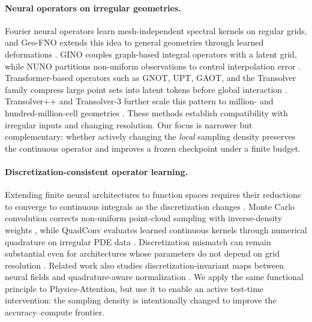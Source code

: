 \documentclass{article}
\begin{document}
\paragraph{Neural operators on irregular geometries.}
Fourier neural operators learn mesh-independent spectral kernels on regular
grids, and Geo-FNO extends this idea to general geometries through learned
deformations \citep{li2021fno,li2023geofno}. GINO couples graph-based integral
operators with a latent grid, while NUNO partitions non-uniform observations to
control interpolation error \citep{li2023gino,liu2023nuno}. Transformer-based
operators such as GNOT, UPT, GAOT, and the Transolver family compress large point
sets into latent tokens before global interaction
\citep{hao2023gnot,alkin2024upt,wen2025gaot,wu2024transolver}. Transolver++ and
Transolver-3 further scale this pattern to million- and hundred-million-cell
geometries \citep{luo2025transolverpp,zhou2026transolver3}. These methods
establish compatibility with irregular inputs and changing resolution. Our
focus is narrower but complementary: whether actively changing the \emph{local}
sampling density preserves the continuous operator and improves a frozen
checkpoint under a finite budget.

\paragraph{Discretization-consistent operator learning.}
Extending finite neural architectures to function spaces requires their
reductions to converge to continuous integrals as the discretization changes
\citep{berner2026functionspaces}. Monte Carlo convolution corrects non-uniform
point-cloud sampling with inverse-density weights
\citep{hermosilla2018montecarlo}, while QuadConv evaluates learned continuous
kernels through numerical quadrature on irregular PDE data
\citep{doherty2024quadconv}. Discretization mismatch can remain substantial even
for architectures whose parameters do not depend on grid resolution
\citep{gao2025discretization}. Related work also studies discretization-invariant
maps between neural fields and quadrature-aware normalization
\citep{wang2022din,kim2026quadnorm}. We apply the same functional principle to
Physics-Attention, but use it to enable an active test-time intervention: the
sampling density is intentionally changed to improve the accuracy--compute
frontier.
\end{document}
